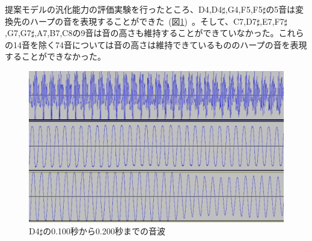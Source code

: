 提案モデルの汎化能力の評価実験を行ったところ、D4,D4$\sharp$,G4,F5,F5$\sharp$の5音は変換先のハープの音を表現することができた~(図\ref{fig:66_22_near})~。そして、C7,D7$\sharp$,E7,F7$\sharp$,G7,G7$\sharp$,A7,B7,C8の9音は音の高さも維持することができていなかった。これらの14音を除く74音については音の高さは維持できているもののハープの音を表現することができなかった。

\begin{figure}[b]
\begin{center}
\includegraphics[width=0.7\hsize]{figure/66_22_det/d4s_0100_0200.png}
\caption{D4$\sharp$の0.100秒から0.200秒までの音波}
\label{fig:66_22_near}
\end{center}
\end{figure}


